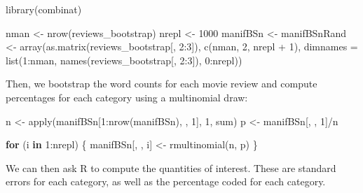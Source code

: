 \documentclass[
]{book}
\newenvironment{Shaded}{\begin{snugshade}}{\end{snugshade}}
\newcommand{\AttributeTok}[1]{\textcolor[rgb]{0.77,0.63,0.00}{#1}}
\newcommand{\ControlFlowTok}[1]{\textcolor[rgb]{0.13,0.29,0.53}{\textbf{#1}}}
\newcommand{\DecValTok}[1]{\textcolor[rgb]{0.00,0.00,0.81}{#1}}
\newcommand{\FunctionTok}[1]{\textcolor[rgb]{0.00,0.00,0.00}{#1}}
\newcommand{\NormalTok}[1]{#1}
\newcommand{\OtherTok}[1]{\textcolor[rgb]{0.56,0.35,0.01}{#1}}
\newcommand{\SpecialCharTok}[1]{\textcolor[rgb]{0.00,0.00,0.00}{#1}}
\begin{document}
\begin{Shaded}
\begin{Highlighting}[]
\FunctionTok{library}\NormalTok{(combinat)}

\NormalTok{nman }\OtherTok{\textless{}{-}} \FunctionTok{nrow}\NormalTok{(reviews\_bootstrap)}
\NormalTok{nrepl }\OtherTok{\textless{}{-}} \DecValTok{1000}
\NormalTok{manifBSn }\OtherTok{\textless{}{-}}\NormalTok{ manifBSnRand }\OtherTok{\textless{}{-}} \FunctionTok{array}\NormalTok{(}\FunctionTok{as.matrix}\NormalTok{(reviews\_bootstrap[,}
    \DecValTok{2}\SpecialCharTok{:}\DecValTok{3}\NormalTok{]), }\FunctionTok{c}\NormalTok{(nman, }\DecValTok{2}\NormalTok{, nrepl }\SpecialCharTok{+} \DecValTok{1}\NormalTok{), }\AttributeTok{dimnames =} \FunctionTok{list}\NormalTok{(}\DecValTok{1}\SpecialCharTok{:}\NormalTok{nman, }\FunctionTok{names}\NormalTok{(reviews\_bootstrap[,}
    \DecValTok{2}\SpecialCharTok{:}\DecValTok{3}\NormalTok{]), }\DecValTok{0}\SpecialCharTok{:}\NormalTok{nrepl))}
\end{Highlighting}
\end{Shaded}

Then, we bootstrap the word counts for each movie review and compute percentages for each category using a multinomial draw:

\begin{Shaded}
\begin{Highlighting}[]
\NormalTok{n }\OtherTok{\textless{}{-}} \FunctionTok{apply}\NormalTok{(manifBSn[}\DecValTok{1}\SpecialCharTok{:}\FunctionTok{nrow}\NormalTok{(manifBSn), , }\DecValTok{1}\NormalTok{], }\DecValTok{1}\NormalTok{, sum)}
\NormalTok{p }\OtherTok{\textless{}{-}}\NormalTok{ manifBSn[, , }\DecValTok{1}\NormalTok{]}\SpecialCharTok{/}\NormalTok{n}

\ControlFlowTok{for}\NormalTok{ (i }\ControlFlowTok{in} \DecValTok{1}\SpecialCharTok{:}\NormalTok{nrepl) \{}
\NormalTok{    manifBSn[, , i] }\OtherTok{\textless{}{-}} \FunctionTok{rmultinomial}\NormalTok{(n, p)}
\NormalTok{\}}
\end{Highlighting}
\end{Shaded}

We can then ask R to compute the quantities of interest. These are standard errors for each category, as well as the percentage coded for each category.
\end{document}
